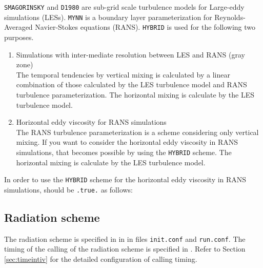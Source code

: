 \verb|SMAGORINSKY| and \verb|D1980| are sub-grid scale turbulence models for Large-eddy simulations (LESs).
\verb|MYNN| is a boundary layer parameterization for Reynolds-Averaged Navier-Stokes equations (RANS).
\verb|HYBRID| is used for the following two purposes.
\begin{enumerate}
\item Simulations with inter-mediate resolution between LES and RANS (gray zone) \\
  The temporal tendencies by vertical mixing is calculated by a linear combination of those calculated by the LES turbulence model and RANS turbulence parameterization. The horizontal mixing is calculate by the LES turbulence model.
\item Horizontal eddy viscosity for RANS simulations \\
  The RANS turbulence parameterization is a scheme considering only vertical mixing.
  If you want to consider the horizontal eddy viscosity in RANS simulations,
  that becomes possible by using the \verb|HYBRID| scheme.
  The horizontal mixing is calculate by the LES turbulence model.
\end{enumerate}

In order to use the \verb|HYBRID| scheme for the horizontal eddy viscosity in RANS simulations,  should be \verb|.true.| as follows:


\subsection{Radiation scheme} \label{subsec:basic_usel_radiation}
The radiation scheme is specified in  in  in files \verb|init.conf| and \verb|run.conf|. The timing of the calling of the radiation scheme is specified in .  Refer to Section \ref{sec:timeintiv} for the detailed configuration of calling timing.

\\

